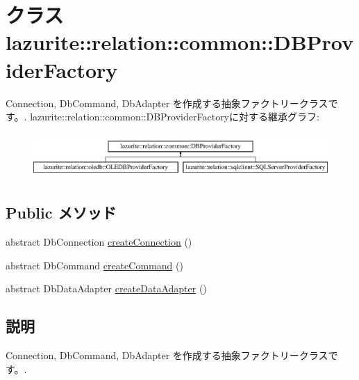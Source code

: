 \hypertarget{classlazurite_1_1relation_1_1common_1_1_d_b_provider_factory}{
\section{クラス lazurite::relation::common::DBProviderFactory}
\label{classlazurite_1_1relation_1_1common_1_1_d_b_provider_factory}
}


Connection, DbCommand, DbAdapter を作成する抽象ファクトリークラスです。.  
lazurite::relation::common::DBProviderFactoryに対する継承グラフ:\begin{figure}[H]
\begin{center}
\leavevmode
\includegraphics[height=1.73375cm]{classlazurite_1_1relation_1_1common_1_1_d_b_provider_factory}
\end{center}
\end{figure}
\subsection*{Public メソッド}
\begin{DoxyCompactItemize}
\item 
abstract DbConnection \hyperlink{classlazurite_1_1relation_1_1common_1_1_d_b_provider_factory_a0b8ab4dd41d983170ee3c5903701597f}{createConnection} ()
\item 
abstract DbCommand \hyperlink{classlazurite_1_1relation_1_1common_1_1_d_b_provider_factory_a80d5a53dcf06278b37133c7013f02f71}{createCommand} ()
\item 
abstract DbDataAdapter \hyperlink{classlazurite_1_1relation_1_1common_1_1_d_b_provider_factory_a7343964afac875d0f5d665879c26f38f}{createDataAdapter} ()
\end{DoxyCompactItemize}


\subsection{説明}
Connection, DbCommand, DbAdapter を作成する抽象ファクトリークラスです。. 

